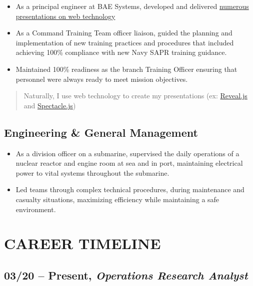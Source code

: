 \documentclass[10pt]{article}
\def\tightlist{}
\begin{document}
\begin{itemize}
\tightlist
\item
  As a principal engineer at BAE Systems, developed and delivered
  \href{https://github.com/jhwohlgemuth?utf8=\%E2\%9C\%93\&tab=repositories\&q=slides\&type=source\&language=}{numerous
  presentations on web technology}
\item
  As a Command Training Team officer liaison, guided the planning and
  implementation of new training practices and procedures that included
  achieving 100\% compliance with new Navy SAPR training guidance.
\item
  Maintained 100\% readiness as the branch Training Officer ensuring
  that personnel were always ready to meet mission objectives.
\end{itemize}

\begin{quote}
Naturally, I use web technology to create my presentations (ex:
\href{https://revealjs.com/\#/}{Reveal.js} and
\href{https://formidable.com/open-source/spectacle/}{Spectacle.js})
\end{quote}

\hypertarget{engineering-general-management}{%
\subsection{Engineering \& General
Management}\label{engineering-general-management}}

\begin{itemize}
\tightlist
\item
  As a division officer on a submarine, supervised the daily operations
  of a nuclear reactor and engine room at sea and in port, maintaining
  electrical power to vital systems throughout the submarine.
\item
  Led teams through complex technical procedures, during maintenance and
  casualty situations, maximizing efficiency while maintaining a safe
  environment.
\end{itemize}

\hypertarget{career-timeline}{%
\section{CAREER TIMELINE}\label{career-timeline}}

\hypertarget{present-operations-research-analyst}{%
\subsection{\texorpdfstring{03/20 -- Present, \textbf{\emph{Operations
Research
Analyst}}}{03/20 -- Present, Operations Research Analyst}}\label{present-operations-research-analyst}}
\end{document}
